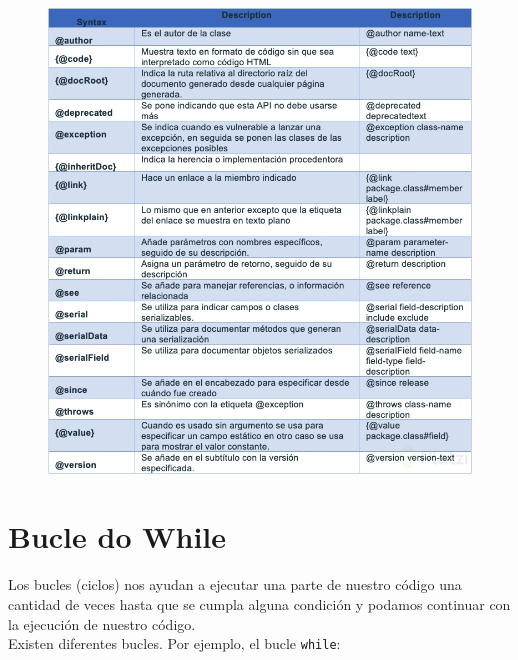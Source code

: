 \documentclass{article}
\begin{document}
\begin{figure}[h!]
  \centering
  \includegraphics[scale=0.65]{./Pictures/028_javadocs_flags.jpg}
\end{figure}


\section{Bucle do While}%
Los bucles (ciclos) nos ayudan a ejecutar una parte de nuestro código una
cantidad de veces hasta que se cumpla alguna condición y podamos continuar con
la ejecución de nuestro código.\\

Existen diferentes bucles. Por ejemplo, el bucle \texttt{while}:

\newpage
\end{document}
